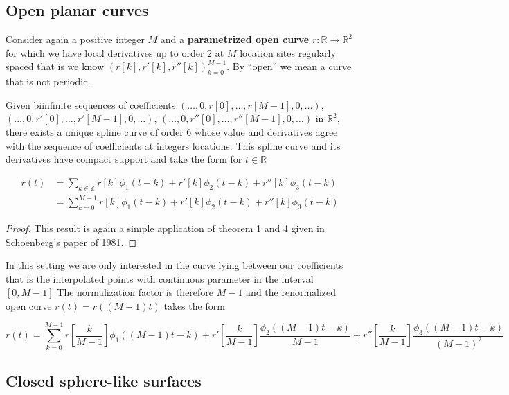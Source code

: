 \documentclass[a4paper, 11pt]{article}
\begin{document}
\subsection{Open planar curves}

Consider again a positive integer $M$ and a \textbf{parametrized open curve} $r: \mathbb{R} \to \mathbb{R}^2$ for which 
we have local derivatives up to order 2 at $M$ location sites regularly spaced that is we know ${(r[k], r'[k], 
r''[k])}_{k=0}^{M-1}$. By “open” we mean a curve that is not periodic.  

\begin{cor}{4}
  Given biinfinite sequences of coefficients $(\dots, 0, r[0], \dots, r[M-1], 0, \dots)$, $(\dots, 0, r'[0], \dots, 
  r'[M-1], 0, \dots)$, $(\dots, 0, r''[0], \dots, r''[M-1], 0, \dots)$ in $\mathbb{R}^2$, there exists a unique spline 
  curve of order $6$ whose value and derivatives agree with the sequence of coefficients at integers locations. This 
  spline curve and its derivatives have compact support and take the form for $t \in \mathbb{R}$

  \begin{align*}
    r(t) &= \sum_{k \in \mathbb{Z}} r[k] \phi_1(t-k) + r'[k] \phi_2(t-k) + r''[k] \phi_3(t-k) \\
    &= \sum_{k=0}^{M-1} r[k] \phi_{1}(t-k) + r'[k] \phi_{2}(t-k) + r''[k] \phi_{3}(t-k)
  \end{align*}
\end{cor}

\begin{proof}
  This result is again a simple application of theorem 1 and 4 given in Schoenberg's paper of 1981.
\end{proof}

\begin{remark}{2}
  In this setting we are only interested in the curve lying between our coefficients that is the interpolated points 
  with continuous parameter in the interval $[0, M-1]$  The normalization factor is therefore $M-1$ and the renormalized 
  open curve $r(t) = r((M-1)t)$ takes the form

  \begin{equation}
    \label{eq:ocurve_no}
    r(t) = \sum_{k=0}^{M-1} r[\frac{k}{M-1}] \phi_{1}((M-1)t-k) + r'[\frac{k}{M-1}] \frac{\phi_{2}((M-1)t-k)}{M-1} + 
  r''[\frac{k}{M-1}] \frac{\phi_{3}((M-1)t-k)}{{(M-1)}^2} \end{equation}
\end{remark}

\subsection{Closed sphere-like surfaces}
\end{document}
